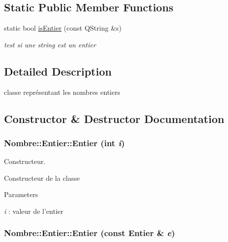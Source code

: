\subsection*{Static Public Member Functions}
\begin{DoxyCompactItemize}
\item 
static bool \hyperlink{classNombre_1_1Entier_a3460b04b6428c23fef45c4d6e204ea80}{isEntier} (const QString \&s)
\begin{DoxyCompactList}\small\item\em test si une string est un entier \item\end{DoxyCompactList}\end{DoxyCompactItemize}


\subsection{Detailed Description}
classe représentant les nombres entiers 

\subsection{Constructor \& Destructor Documentation}
\hypertarget{classNombre_1_1Entier_aba1baf196e52fb9ea0398e5c5695bf61}{
\subsubsection[{Entier}]{\setlength{\rightskip}{0pt plus 5cm}Nombre::Entier::Entier (int {\em i})}}
\label{classNombre_1_1Entier_aba1baf196e52fb9ea0398e5c5695bf61}


Constructeur. 

Constructeur de la classe


\begin{DoxyParams}{Parameters}
\item[{\em i}]: valeur de l'entier \end{DoxyParams}
\hypertarget{classNombre_1_1Entier_a15923a12f9ef441d981f7c8b0977d233}{
\subsubsection[{Entier}]{\setlength{\rightskip}{0pt plus 5cm}Nombre::Entier::Entier (const {\bf Entier} \& {\em e})}}
\label{classNombre_1_1Entier_a15923a12f9ef441d981f7c8b0977d233}


